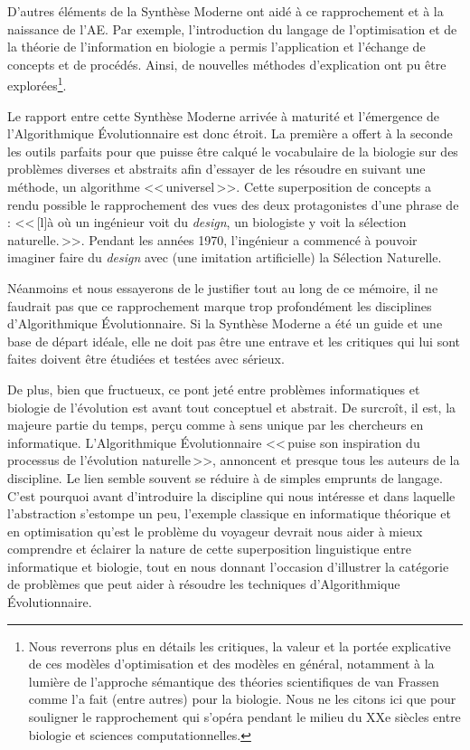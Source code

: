 D'autres éléments de la Synthèse Moderne ont aidé à ce rapprochement et à la naissance de l'AE. Par exemple, l'introduction du langage de l'optimisation et de la théorie de l'information en biologie \citep{maynardsmith78optimizationtheoryinevolution} a permis l'application et l'échange de concepts et de procédés. Ainsi, de nouvelles méthodes d'explication ont pu être explorées\footnote{Nous reverrons plus en détails les critiques, la valeur et la portée explicative de ces modèles d'optimisation et des modèles en général, notamment à la lumière de l'approche sémantique des théories scientifiques de van Frassen comme l'a fait (entre autres) \citet{beatty1980whatswrongwithreceivedwiew} pour la biologie. Nous ne les citons ici que pour souligner le rapprochement qui s'opéra pendant le milieu du XXe siècles entre biologie et sciences computationnelles.}.

Le rapport entre cette Synthèse Moderne arrivée à maturité et l'émergence de l'Algorithmique Évolutionnaire est donc étroit. La première a offert à la seconde les outils parfaits pour que puisse être calqué le vocabulaire de la biologie sur des problèmes diverses et abstraits afin d'essayer de les résoudre en suivant une méthode, un algorithme <<\,universel\,>>. Cette superposition de concepts a rendu possible le rapprochement des vues des deux protagonistes d'une phrase de \citet[p. 179]{maynardsmith00theconceptofinformationinbiology} : <<\,[l]à où un ingénieur voit du \emph{design}, un biologiste y voit la sélection naturelle.\,>>. Pendant les années 1970, l'ingénieur a commencé à pouvoir imaginer faire du \emph{design} avec (une imitation artificielle) la Sélection Naturelle.

Néanmoins et nous essayerons de le justifier tout au long de ce mémoire, il ne faudrait pas que ce rapprochement marque trop profondément les disciplines d'Algorithmique Évolutionnaire. Si la Synthèse Moderne a été un guide et une base de départ idéale, elle ne doit pas être une entrave et les critiques qui lui sont faites doivent être étudiées et testées avec sérieux.

De plus, bien que fructueux, ce pont jeté entre problèmes informatiques et biologie de l'évolution est avant tout conceptuel et abstrait. De surcroît, il est, la majeure partie du temps, perçu comme à sens unique par les chercheurs en informatique. L'Algorithmique Évolutionnaire <<\,puise son inspiration du processus de l'évolution naturelle\,>>, annoncent \citet[p. 1]{eiben03introductiontoevolutionarycomputing} et presque tous les auteurs de la discipline. Le lien semble souvent se réduire à de simples emprunts de langage. C'est pourquoi avant d'introduire la discipline qui nous intéresse et dans laquelle l'abstraction s'estompe un peu, l'exemple classique en informatique théorique et en optimisation qu'est le problème du voyageur devrait nous aider à mieux comprendre et éclairer la nature de cette superposition linguistique entre informatique et biologie, tout en nous donnant l'occasion d'illustrer la catégorie de problèmes que peut aider à résoudre les techniques d'Algorithmique Évolutionnaire.

